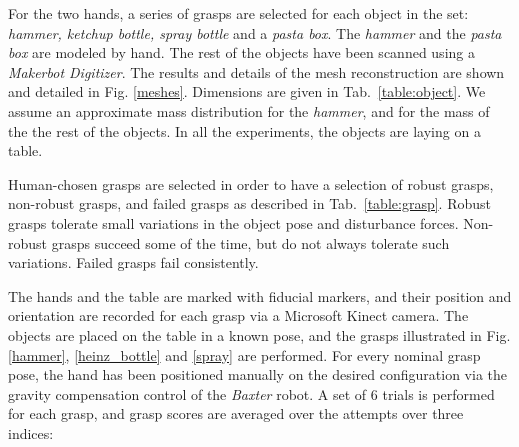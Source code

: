 For the two hands, a series of grasps are selected for each object in the set:
\emph{hammer, ketchup bottle, spray bottle} and a \emph{pasta box}.
The \emph{hammer} and the \emph{pasta box} are modeled by hand. The rest of the objects have been scanned using a \emph{Makerbot Digitizer}. The results and details of the mesh reconstruction are shown and detailed in Fig. \ref{meshes}.
Dimensions are given in Tab.~\ref{table:object}.
We assume an approximate mass distribution for the \emph{hammer}, and for the mass of the the rest of the objects.
In all the experiments, the objects are laying on a table.


Human-chosen grasps are selected in order to have a selection of robust grasps, non-robust grasps, and failed grasps as described in Tab.~\ref{table:grasp}. Robust grasps tolerate small variations in the object pose and disturbance forces. Non-robust grasps succeed some of the time, but do not always tolerate such variations.  Failed grasps fail consistently.  

The hands and the table are marked with fiducial markers, and their position and orientation are recorded for each grasp via a Microsoft Kinect camera. The objects are placed on the table in a known pose, and the grasps illustrated in Fig. \ref{hammer}, \ref{heinz_bottle} and \ref{spray} are performed. For every nominal grasp pose, the hand has been positioned manually on the desired configuration via the gravity compensation control of the \emph{Baxter} robot. A set of $6$ trials is performed for each grasp, and grasp scores are averaged over the attempts over three indices:

